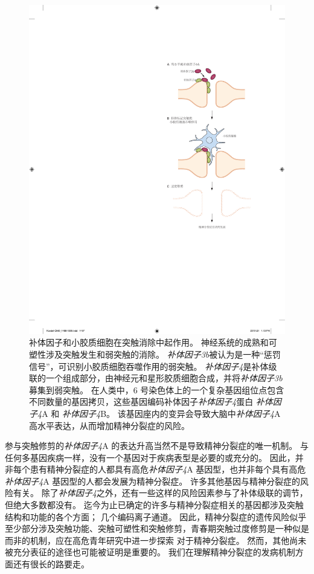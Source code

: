 \begin{figure}[htbp]
	\centering
	\includegraphics[width=0.61\linewidth]{chap60/fig_60_7}
	\caption{补体因子和小胶质细胞在突触消除中起作用。
		神经系统的成熟和可塑性涉及突触发生和弱突触的消除。
		\textit{补体因子3b}被认为是一种“惩罚信号”，可识别小胶质细胞吞噬作用的弱突触。
		\textit{补体因子4}是补体级联的一个组成部分，由神经元和星形胶质细胞合成，并将\textit{补体因子3b}募集到弱突触。
		在人类中，6 号染色体上的一个复杂基因组位点包含不同数量的基因拷贝，这些基因编码补体因子\textit{补体因子4}蛋白 \textit{补体因子4}A 和 \textit{补体因子4}B。
		该基因座内的变异会导致大脑中\textit{补体因子4}A 高水平表达，从而增加精神分裂症的风险。}
	\label{fig:60_7}
\end{figure}


参与突触修剪的\textit{补体因子4}A 的表达升高当然不是导致精神分裂症的唯一机制。
与任何多基因疾病一样，没有一个基因对于疾病表型是必要的或充分的。
因此，并非每个患有精神分裂症的人都具有高危\textit{补体因子4}A 基因型，也并非每个具有高危\textit{补体因子4}A 基因型的人都会发展为精神分裂症。 许多其他基因与精神分裂症的风险有关。
除了\textit{补体因子4}之外，还有一些这样的风险因素参与了补体级联的调节，但绝大多数都没有。
迄今为止已确定的许多与精神分裂症相关的基因都涉及突触结构和功能的各个方面；
几个编码离子通道。
因此，精神分裂症的遗传风险似乎至少部分涉及突触功能、突触可塑性和突触修剪，青春期突触过度修剪是一种似是而非的机制，应在高危青年研究中进一步探索 对于精神分裂症。
然而，其他尚未被充分表征的途径也可能被证明是重要的。
我们在理解精神分裂症的发病机制方面还有很长的路要走。



